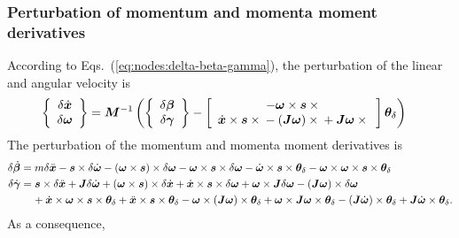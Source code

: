 \documentclass[10pt,dvips,fleqn,subeqn]{report}
\newcommand{\T}[1]{\bm{#1}}
\newcommand{\TT}[1]{\bm{#1}}
\begin{document}
\subsubsection{Perturbation of momentum and momenta moment derivatives}
According to Eqs.~(\ref{eq:nodes:delta-beta-gamma}),
the perturbation of the linear and angular velocity is
\begin{subequations}
\begin{align}
	\cubr{\cvvect{
		\delta\dot{\T{x}}
		\\
		\delta\T{\omega}
	}}
	&=
	\TT{M}^{-1} \plbr{
		\cubr{\cvvect{
			\delta\T{\beta}
			\\
			\delta\T{\gamma}
		}}
		-
		\sqbr{\cvvect{
			-\T{\omega} \times \T{s} \times{}
			\\
			\dot{\T{x}} \times \T{s} \times{}
			-
			\plbr{\TT{J} \T{\omega}} \times{}
			+
			\TT{J} \T{\omega} \times{}
		}} \T{\theta}_{\delta}
	}
\end{align}
\end{subequations}
The perturbation of the momentum and momenta moment derivatives is
\begin{subequations}
\begin{align}
	\delta\dot{\T{\beta}}
	&=
	m \delta\ddot{\T{x}}
	-
	\T{s} \times \delta\dot{\T{\omega}}
	-
	\plbr{\T{\omega} \times \T{s}} \times \delta \T{\omega}
	-
	\T{\omega} \times \T{s} \times \delta\T{\omega}
	-
	\dot{\T{\omega}} \times \T{s} \times \T{\theta}_{\delta}
	-
	\T{\omega} \times \T{\omega} \times \T{s} \times \T{\theta}_{\delta}
	\\
	\delta\dot{\T{\gamma}}
	&=
	\T{s} \times \delta\ddot{\T{x}}
	+
	\TT{J} \delta\dot{\T{\omega}}
	+
	\plbr{\T{\omega}\times \T{s}} \times \delta\dot{\T{x}}
	+
	\dot{\T{x}} \times \T{s} \times \delta\T{\omega}
	+
	\T{\omega} \times \TT{J} \delta\T{\omega}
	-
	\plbr{\TT{J} \T{\omega}} \times \delta\T{\omega}
	\nonumber \\ &\mbox{\hphantom{= }}
	+
	\dot{\T{x}} \times \T{\omega} \times \T{s} \times \T{\theta}_{\delta}
	+
	\ddot{\T{x}} \times \T{s} \times \T{\theta}_{\delta}
	-
	\T{\omega} \times \plbr{\TT{J} \T{\omega}} \times \T{\theta}_{\delta}
	+
	\T{\omega} \times \TT{J} \T{\omega} \times \T{\theta}_{\delta}
	-
	\plbr{\TT{J} \dot{\T{\omega}}} \times \T{\theta}_{\delta}
	+
	\TT{J} \dot{\T{\omega}} \times \T{\theta}_{\delta}
	.
\end{align}
\end{subequations}
As a consequence,
\end{document}
